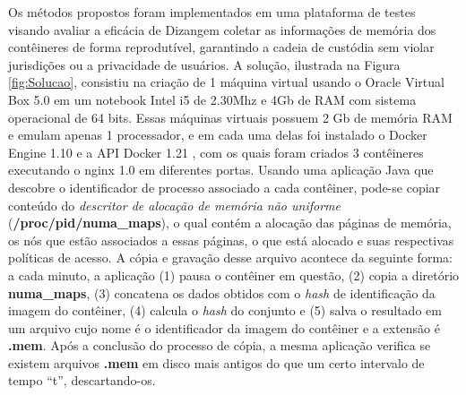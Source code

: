 \documentclass[conference]{IEEEtran}
\newcommand{\marcosT}[1]{{\color{red}{TODO: #1}}}
\newcommand{\fancyname}{Dizang}
\begin{document}
Os métodos propostos foram implementados em uma plataforma de testes visando avaliar a eficácia de \fancyname em coletar as informações de memória dos contêineres de forma reprodutível, garantindo a cadeia de custódia sem violar jurisdições ou a privacidade de usuários.
%
A solução, ilustrada na Figura \ref{fig:Solucao}, consistiu na criação de 1 máquina virtual usando o Oracle Virtual Box 5.0 \cite{VirtualBox} em um notebook Intel i5 de 2.30Mhz e 4Gb de RAM com sistema operacional de 64 bits.
%
Essas máquinas virtuais possuem 2 Gb de memória RAM e emulam apenas 1 processador, e em cada uma delas foi instalado o Docker Engine 1.10 \cite{DockerInc} e a API Docker 1.21 \cite{DockerInc}, com os quais foram criados 3 contêineres executando o nginx 1.0 \cite{nginx} em diferentes portas. 
%
Usando uma aplicação Java que descobre o identificador de processo associado a cada contêiner, pode-se copiar conteúdo do \textit{descritor de alocação de memória não uniforme} (\textbf{/proc/pid/numa\_maps}), o qual contém a alocação das páginas de memória, os nós que estão associados a essas páginas, o que está alocado e suas respectivas políticas de acesso\cite{UnixManPages_numa_maps}.
%
A cópia e gravação desse arquivo acontece da seguinte forma: a cada minuto, a aplicação (1) pausa o contêiner em questão, (2) copia a diretório \textbf{numa\_maps}, (3)  concatena os dados obtidos com o \textit{hash} de identificação da imagem do contêiner, (4) calcula o \textit{hash} do conjunto e (5) salva o resultado em um arquivo cujo nome é o identificador da imagem do contêiner e a extensão é \textbf{.mem}. 
%
Após a conclusão do processo de cópia, a mesma aplicação verifica se existem arquivos \textbf{.mem} em disco mais antigos do que um certo intervalo de tempo ``t'', descartando-os.
%


%
\end{document}

